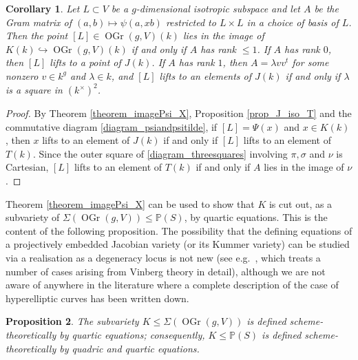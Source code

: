 \documentclass{article} %
\newtheorem{proposition}{Proposition}[section]
\newtheorem{corollary}[proposition]{Corollary}
\numberwithin{equation}{section}
\renewcommand{\P}{\mathbb{P}}
\DeclareMathOperator{\OGr}{OGr}
\begin{document}
\begin{corollary}
    Let $L\subset V$ be a $g$-dimensional isotropic subspace and let $A$ be the Gram matrix of $(a,b)\mapsto \psi(a,xb)$ restricted to $L\times L$ in a choice of basis of $L$.
    Then the point $[L] \in \OGr(g, V)(k)$ lies in the image of $K(k)\hookrightarrow \OGr(g,V)(k)$ if and only if $A$ has rank $\leq 1$.
    If $A$ has rank $0$, then $[L]$ lifts to a point of $J(k)$.
    If $A$ has rank $1$, then $A = \lambda v v^t$ for some nonzero $v\in k^g$ and $\lambda \in k$, and $[L]$ lifts to an elements of $J(k)$ if and only if $\lambda$ is a square in $(k^{\times})^2$.
\end{corollary}
\begin{proof}
    By Theorem \ref{theorem_imagePsi_X}, Proposition \ref{prop_J_iso_T} and the commutative diagram \eqref{diagram_psiandpsitilde}, if $[L] = \Psi(x)$ and $x\in K(k)$, then $x$ lifts to an element of $J(k)$ if and only if $[L]$ lifts to an element of $T(k)$.
    Since the outer square of \eqref{diagram_threesquares} involving $\pi, \sigma$ and $\nu$ is Cartesian, $[L]$ lifts to an element of $T(k)$ if and only if $A$ lies in the image of $\nu$.
\end{proof}
Theorem
\ref{theorem_imagePsi_X} can be used to show that $K$ is cut out, as a subvariety of $\Sigma(\OGr(g,V)) \leq \P(S)$, by quartic equations. This is the content of the following proposition. The possibility that the defining equations of a projectively embedded Jacobian variety (or its Kummer variety) can be studied via a realisation as a degeneracy locus is not new (see e.g.\ \cite{Gru13}, which treats a number of cases arising from Vinberg theory in detail), although we are not aware of anywhere in the literature where a complete description of the case of hyperelliptic curves has been written down. 
\begin{proposition}
    The subvariety $K  \leq \Sigma(\OGr(g,V))$ is defined scheme-theoretically by quartic equations; consequently, $K \leq \P(S)$ is defined scheme-theoretically by quadric and quartic equations. 
\end{proposition}
\end{document}
